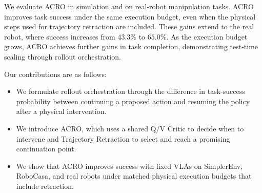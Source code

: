We evaluate ACRO in simulation and on real-robot manipulation tasks. ACRO improves task success under the same execution budget, even when the physical steps used for trajectory retraction are included. These gains extend to the real robot, where success increases from $43.3\%$ to $65.0\%$. As the execution budget grows, ACRO achieves further gains in task completion, demonstrating test-time scaling through rollout orchestration.

Our contributions are as follows:
\begin{itemize}
\setlength{\itemsep}{2pt}
\item We formulate rollout orchestration through the difference in task-success probability between continuing a proposed action and resuming the policy after a physical intervention.
\item We introduce ACRO, which uses a shared Q/V Critic to decide when to intervene and Trajectory Retraction to select and reach a promising continuation point.
\item We show that ACRO improves success with fixed VLAs on SimplerEnv, RoboCasa, and real robots under matched physical execution budgets that include retraction.
\end{itemize}
